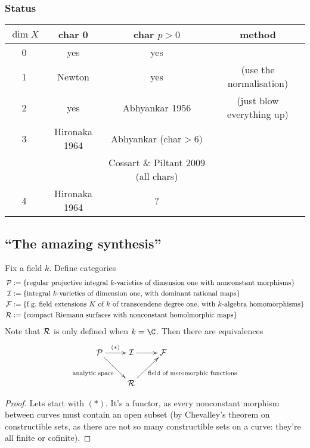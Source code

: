 \documentclass[11pt]{article}
\begin{document}
\begin{Nov8}
\subsubsection*{Status}
\newcommand{\tick}{yes}
\begin{tabular}{c||c|c|c}
$\dim X$&char 0& char $p>0$&method\\\hline\hline
0&\tick&\tick\\\hline
1&Newton&\tick&(use the normalisation)\\\hline
2&\tick&Abhyankar 1956&(just blow everything up)\\\hline
3&Hironaka 1964&Abhyankar (char$>6)$\\
&&Cossart \& Piltant 2009 (all chars)\\\hline
4&Hironaka 1964&?
\end{tabular}
\subsection*{``The amazing synthesis''}
\begin{thm*}
Fix a field $k$. Define categories
\begin{alignat*}{2}
\calP&:=\{\textup{regular projective integral $k$-varieties of dimension one with nonconstant morphisms}\}%
\\\calI&:=\{\textup{integral $k$-varieties of dimension one, with dominant rational maps}\}%
\\\calF&:=\{\textup{f.g.\ field extensions $K$ of $k$ of transcendene degree one, with $k$-algebra homomorphisms}\}%
\\\calR&:=\{\textup{compact Riemann surfaces with nonconstant homolmorphic maps}\}%
\end{alignat*}
Note that $\mathcal{R}$ is only defined when $k=\C$. Then there are equivalences
\[\xymatrix{
 \calP\ar[rd]_{\textup{analytic space}}\ar[r]^{(*)}& \calI\ar[r]& \calF\\
&\calR\ar[ur]_{\textup{field of meromorphic functions}}
}\]
\end{thm*}
\begin{proof}
Lets start with $(*)$. It's a functor, as every nonconstant morphism between curves must contain an open subset (by Chevalley's theorem on constructible sets, as there are not so many constructible sets on a curve: they're all finite or cofinite).


\end{proof}
\end{Nov8}
\end{document}
